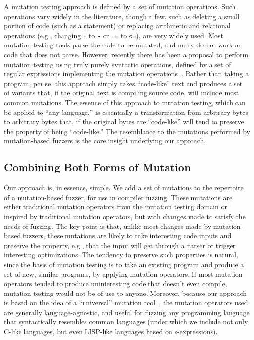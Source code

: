 A mutation testing approach is defined by a set of mutation operations.  Such operations vary widely in the literature, though a few, such as deleting a small portion of code (such as a statement) or replacing arithmetic and relational operations (e.g., changing {\tt +} to {\tt -} or {\tt ==} to {\tt <=}), are very widely used.  Most mutation testing tools parse the code to be mutated, and many do not work on code that does not parse.  However, recently there has been a proposal to perform mutation testing using truly purely syntactic operations, defined by a set of regular expressions implementing the mutation operations~\cite{regexpMut}.  Rather than taking a program, per se, this approach simply takes ``code-like'' text and produces a set of variants that, if the original text is compiling source code, will include most common mutations.  The essence of this approach to mutation testing, which can be applied to ``any language,'' is essentially a transformation from arbitrary bytes to arbitrary bytes that, if the original bytes are ``code-like'' will tend to preserve the property of being ``code-like.''  The resemblance to the mutations performed by mutation-based fuzzers is the core insight underlying our approach.

\subsection{Combining Both Forms of Mutation}

Our approach is, in essence, simple.  We add a set of mutations to the repertoire of a mutation-based fuzzer, for use in compiler fuzzing.  These mutations are either traditional mutation operators from the mutation testing domain or inspired by traditional mutation operators, but with changes made to satisfy the needs of fuzzing.  The key point is that, unlike most changes made by mutation-based fuzzers, these mutations are likely to take interesting code inputs and preserve the property, e.g., that the input will get through a parser or trigger interesting optimizations.  The tendency to preserve such properties is natural, since the basis of mutation testing is to take an existing program and produce a set of new, similar programs, by applying mutation operators.  If most mutation operators tended to produce uninteresting code that doesn't even compile, mutation testing would not be of use to anyone.  Moreover, because our approach is based on the idea of a ``universal'' mutation tool~\cite{regexpMut}, the mutation operators used are generally language-agnostic, and useful for fuzzing any programming language that syntactically resembles common languages (under which we include not only C-like languages, but even LISP-like languages based on s-expressions).

